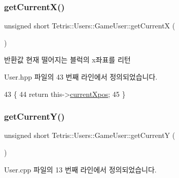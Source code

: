 \subsubsection{\texorpdfstring{get\+Current\+X()}{getCurrentX()}\hspace{0.1cm}{\footnotesize\ttfamily [2/2]}}
{\footnotesize\ttfamily unsigned short Tetris\+::\+Users\+::\+Game\+User\+::get\+CurrentX (\begin{DoxyParamCaption}{ }\end{DoxyParamCaption})\hspace{0.3cm}{\ttfamily [inline]}}

\begin{DoxyReturn}{반환값}
현재 떨어지는 블럭의 x좌표를 리턴 
\end{DoxyReturn}


User.\+hpp 파일의 43 번째 라인에서 정의되었습니다.


\begin{DoxyCode}
43                                             \{
44                     \textcolor{keywordflow}{return} this->\hyperlink{class_tetris_1_1_users_1_1_game_user_a3edcace8f88494f9cee4ba99ba9b6c87}{currentXpos};
45                 \}
\end{DoxyCode}
\mbox{\label{class_tetris_1_1_users_1_1_game_user_af5bd7ff0b575af1b42b093488cff97e2}} 
\subsubsection{\texorpdfstring{get\+Current\+Y()}{getCurrentY()}\hspace{0.1cm}{\footnotesize\ttfamily [1/2]}}
{\footnotesize\ttfamily unsigned short Tetris\+::\+Users\+::\+Game\+User\+::get\+CurrentY (\begin{DoxyParamCaption}{ }\end{DoxyParamCaption})}



User.\+cpp 파일의 13 번째 라인에서 정의되었습니다.


